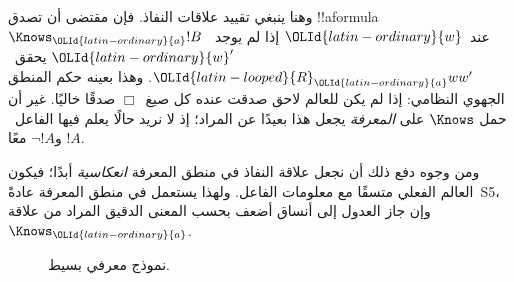 \documentclass[../../../include/open-logic-section]{subfiles}
\begin{document}
وهنا ينبغي تقييد علاقات النفاذ. فإن مقتضى
 أن تصدق !!a{formula}~$\Knows_\OLId{latin-ordinary}{a} !B$ عند~$\OLId{latin-ordinary}{w}$
إذا لم يوجد~$\OLId{latin-ordinary}{w}'$ يحقق~$\OLId{latin-looped}{R}_\OLId{latin-ordinary}{a} ww'$. وهذا بعينه حكم المنطق الجهوي النظامي:
إذا لم يكن للعالم لاحق صدقت عنده كل صيغ~$\Box$ صدقًا خاليًا. غير أن حمل
$\Knows$ على \emph{المعرفة} يجعل هذا بعيدًا عن المراد؛ إذ لا نريد حالًا
يعلم فيها الفاعل~$!A$ و$\lnot !A$ معًا.

ومن وجوه دفع ذلك أن نجعل علاقة النفاذ في منطق المعرفة \emph{انعكاسية}
أبدًا؛ فيكون العالم الفعلي متسقًا مع معلومات الفاعل. ولهذا يستعمل في منطق
المعرفة عادةً~S5، وإن جاز العدول إلى أنساق أضعف بحسب المعنى الدقيق المراد
من علاقة~$\Knows_\OLId{latin-ordinary}{a}$.

\begin{figure}
  \begin{center}
  \end{center}
  \caption{نموذج معرفي بسيط.}
\end{figure}
\end{document}
